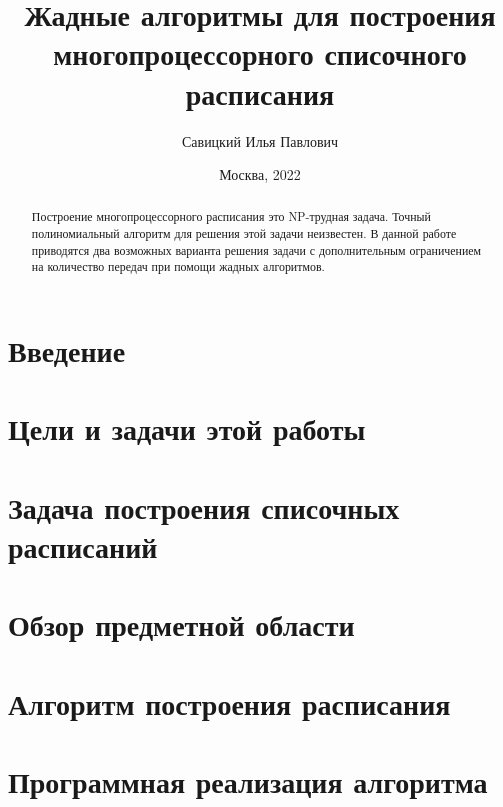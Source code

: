 \documentclass[12pt]{article}
\author{Савицкий Илья Павлович}
\title{Жадные алгоритмы для построения многопроцессорного списочного расписания}
\date{Москва, 2022}
\begin{document}

\newpage
\begin{abstract}
    Построение многопроцессорного расписания это NP-трудная задача. Точный полиномиальный алгоритм для решения этой задачи неизвестен. В данной работе приводятся два возможных варианта решения задачи с дополнительным ограничением на количество передач при помощи жадных алгоритмов.
\end{abstract}
\newpage
\tableofcontents
\newpage
\section{Введение}

\newpage
\section{Цели и задачи этой работы}

\newpage
\section{Задача построения списочных расписаний}

\newpage
\section{Обзор предметной области}


\newpage
\section{Алгоритм построения расписания}


\newpage
\section{Программная реализация алгоритма}

\end{document}
